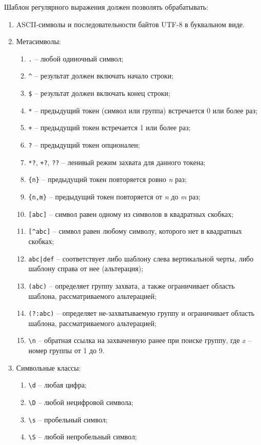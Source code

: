 Шаблон регулярного выражения должен позволять обрабатывать:
\begin{enumerate}
	\item ASCII-символы и последовательности байтов UTF-8 в буквальном виде.
	\item Метасимволы: 
	\begin{enumerate}
		\item\verb`.` – любой одиночный символ;
		\item\verb`^` – результат должен включать начало строки;
		\item\verb`$` – результат должен включать конец строки;
		\item\verb`*` – предыдущий токен (символ или группа) встречается 0 или более раз;
		\item\verb`+` – предыдущий токен встречается 1 или более раз;
		\item\verb`?` – предыдущий токен опционален;
		\item\verb`*?`, \verb`+?`, \verb`??` – ленивый режим захвата для данного токена;
		\item\verb`{n}` – предыдущий токен повторяется ровно \textit{n} раз;
		\item\verb`{n,m}` – предыдущий токен повторяется от \textit{n} до \textit{m} раз;
		\item\verb`[abc]`  – символ равен одному из символов в квадратных скобках;
		\item\verb`[^abc]`  – символ равен любому символу, которого нет в квадратных скобках;
		\item\verb`abc|def` – соответствует либо шаблону слева вертикальной черты, либо шаблону справа от нее (альтерация);
		\item\verb`(abc)` – определяет группу захвата, а также ограничивает область шаблона, рассматриваемого альтерацией;
		\item\verb`(?:abc)` – определяет не-захватываемую группу и ограничивает область шаблона, рассматриваемого альтерацией;
		\item\verb`\n` – обратная ссылка на захваченную ранее при поиске группу, где \textit{x} – номер группы от 1 до 9.
	\end{enumerate}
	\item Символьные классы:
	\begin{enumerate} 
		\item\verb`\d` – любая цифра;
		\item\verb`\D` – любой нецифровой символа;
		\item\verb`\s` – пробельный символ;
		\item\verb`\S` – любой непробельный символ;

\end{enumerate}
\end{enumerate}
